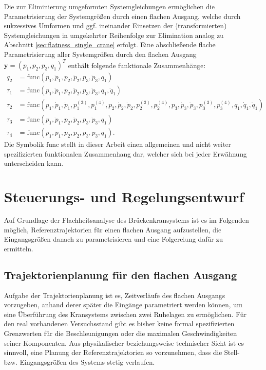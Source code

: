 Die zur Eliminierung umgeformten Systemgleichungen ermöglichen die Parametrisierung der Systemgrößen durch einen flachen Ausgang, welche durch sukzessives Umformen und ggf. ineinander Einsetzen der (transformierten) Systemgleichungen in umgekehrter Reihenfolge zur Elimination analog zu Abschnitt \ref{sec:flatness_single_crane} erfolgt. Eine abschließende flache Parametrisierung aller Systemgrößen durch den flachen Ausgang $\mathbf{y} = (p_1, p_2, p_3, q_1)^T$ enthält folgende funktionale Zusammenhänge:
\begin{subequations}
	\begin{align}
		q_2 &= \mathrm{func}(p_1, \ddot{p}_1, p_2, \ddot{p}_2, p_3, \ddot{p}_3, q_1) \\
		\tau_1 &= \mathrm{func}(p_1, \ddot{p}_1, p_2, \ddot{p}_2, p_3, \ddot{p}_3, q_1, \ddot{q}_1) \\
		\tau_2 &= \mathrm{func}(p_1, \dot{p}_1, \ddot{p}_1, p_1^{(3)}, p_1^{(4)}, p_2, \dot{p}_2, \ddot{p}_2, p_2^{(3)}, p_2^{(4)}, p_3, \dot{p}_3, \ddot{p}_3, p_3^{(3)}, p_3^{(4)}, q_1, \dot{q}_1, \ddot{q}_1) \label{subeq:tau2_parametrization_double_crane} \\
		\tau_3 &= \mathrm{func}(p_1, \ddot{p}_1, p_2, \ddot{p}_2, p_3, \ddot{p}_3, q_1) \\
		\tau_4 &= \mathrm{func}(p_1, \ddot{p}_1, p_2, \ddot{p}_2, p_3, \ddot{p}_3, q_1).
	\end{align}
\end{subequations}
Die Symbolik $\mathrm{func}$ stellt in dieser Arbeit einen allgemeinen und nicht weiter spezifizierten funktionalen Zusammenhang dar, welcher sich bei jeder Erwähnung unterscheiden kann.

\chapter{Steuerungs- und Regelungsentwurf}
Auf Grundlage der Flachheitsanalyse des Brückenkransystems ist es im Folgenden möglich, Referenztrajektorien für einen flachen Ausgang aufzustellen, die Eingangsgrößen danach zu parametrisieren und eine Folgerelung dafür zu ermitteln. 

\section{Trajektorienplanung für den flachen Ausgang}
\label{sec:trajectory_flat_output}
Aufgabe der Trajektorienplanung ist es, Zeitverläufe des flachen Ausgangs vorzugeben, anhand derer später die Eingänge parametriert werden können, um eine Überführung des Kransystems zwischen zwei Ruhelagen zu ermöglichen. Für den real vorhandenen Versuchsstand gibt es bisher keine formal spezifizierten Grenzwerten für die Beschleunigungen oder die maximalen Geschwindigkeiten seiner Komponenten. Aus physikalischer beziehungsweise technischer Sicht ist es sinnvoll, eine Planung der Referenztrajektorien so vorzunehmen, dass die Stell- bzw. Eingangsgrößen des Systems stetig verlaufen.

